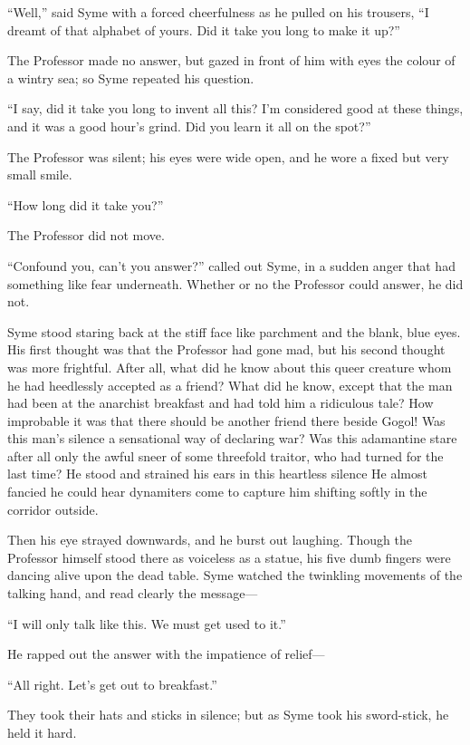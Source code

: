 \documentclass{book}
\begin{document}
“Well,” said Syme with a forced cheerfulness as he pulled on his trousers, “I dreamt of that alphabet of yours. Did it take you long to make it up?”

The Professor made no answer, but gazed in front of him with eyes the colour of a wintry sea; so Syme repeated his question.

“I say, did it take you long to invent all this? I’m considered good at these things, and it was a good hour’s grind. Did you learn it all on the spot?”

The Professor was silent; his eyes were wide open, and he wore a fixed but very small smile.

“How long did it take you?”

The Professor did not move.

“Confound you, can’t you answer?” called out Syme, in a sudden anger that had something like fear underneath. Whether or no the Professor could answer, he did not.

Syme stood staring back at the stiff face like parchment and the blank, blue eyes. His first thought was that the Professor had gone mad, but his second thought was more frightful. After all, what did he know about this queer creature whom he had heedlessly accepted as a friend? What did he know, except that the man had been at the anarchist breakfast and had told him a ridiculous tale? How improbable it was that there should be another friend there beside Gogol! Was this man’s silence a sensational way of declaring war? Was this adamantine stare after all only the awful sneer of some threefold traitor, who had turned for the last time? He stood and strained his ears in this heartless silence He almost fancied he could hear dynamiters come to capture him shifting softly in the corridor outside.

Then his eye strayed downwards, and he burst out laughing. Though the Professor himself stood there as voiceless as a statue, his five dumb fingers were dancing alive upon the dead table. Syme watched the twinkling movements of the talking hand, and read clearly the message—

“I will only talk like this. We must get used to it.”

He rapped out the answer with the impatience of relief—

“All right. Let’s get out to breakfast.”

They took their hats and sticks in silence; but as Syme took his sword-stick, he held it hard.
\end{document}
